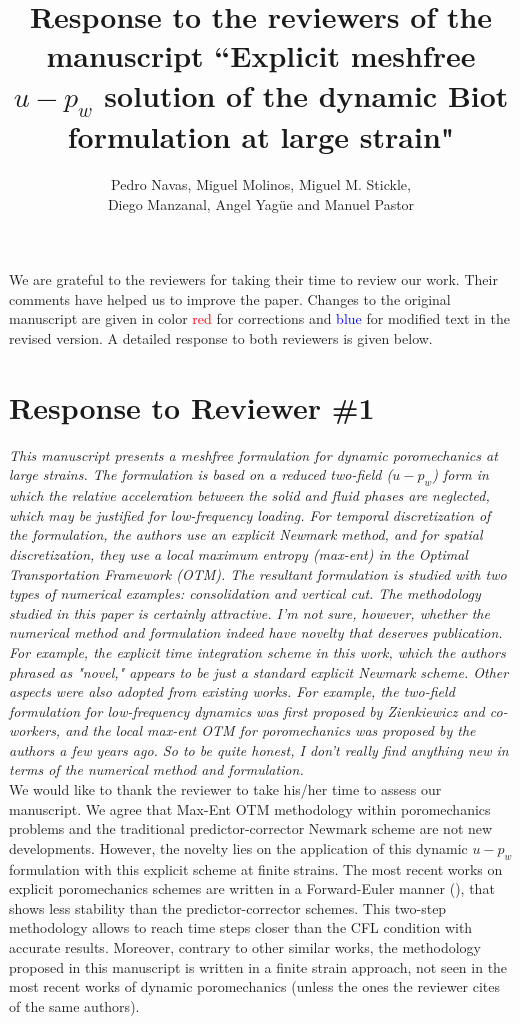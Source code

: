 \documentclass[12pt]{article}
\title{Response to the reviewers of the manuscript ``Explicit meshfree $u-p_w$ solution of the dynamic Biot formulation at large strain"}
\author{Pedro Navas, Miguel Molinos, Miguel M. Stickle, \\ Diego Manzanal, Angel Yag\"ue and Manuel Pastor}
\begin{document}
\maketitle

We  are grateful to the reviewers for taking their time  to review our work. Their comments have helped us to improve the paper. Changes to the original manuscript are given in  color \textcolor{red}{red} for corrections and  \textcolor{blue}{blue} for modified text in the revised version.  A detailed response to both reviewers is given below.

\section*{Response to Reviewer \#1}
{\it
This manuscript presents a meshfree formulation for dynamic poromechanics at large strains. The formulation is based on a reduced two-field ($u-p_w$) form in which the relative acceleration between the solid and fluid phases are neglected, which may be justified for low-frequency loading. For temporal discretization of the formulation, the authors use an explicit Newmark method, and for spatial discretization, they use a local maximum entropy (max-ent) in the Optimal Transportation Framework (OTM). The resultant formulation is studied with two types of numerical examples: consolidation and vertical cut. The methodology studied in this paper is certainly attractive. I'm not sure, however, whether the numerical method and formulation indeed have novelty that deserves publication. For example, the explicit time integration scheme in this work, which the authors phrased as "novel," appears to be just a standard explicit Newmark scheme. Other aspects were also adopted from existing works. For example, the two-field formulation for low-frequency dynamics was first proposed by Zienkiewicz and co-workers, and the local max-ent OTM for poromechanics was proposed by the authors a few years ago. So to be quite honest, I don't really find anything new in terms of the numerical method and formulation.}\\

We would like to thank the reviewer to take his/her time to assess our manuscript. We agree that Max-Ent OTM methodology within poromechanics problems and the traditional predictor-corrector Newmark scheme are not new developments. However, the novelty lies on the application of this dynamic $u-p_w$ formulation with this explicit scheme at finite strains. The most recent works on explicit poromechanics schemes are written in a Forward-Euler manner (\cite{ZHANG_et_al_2009}), that shows less stability than the predictor-corrector schemes. This two-step methodology allows to reach time steps closer than the CFL condition with accurate results. Moreover, contrary to other similar works, the methodology proposed in this manuscript is written in a finite strain approach, not seen in the most recent works of dynamic poromechanics (unless the ones the reviewer cites of the same authors).\\
\end{document}
